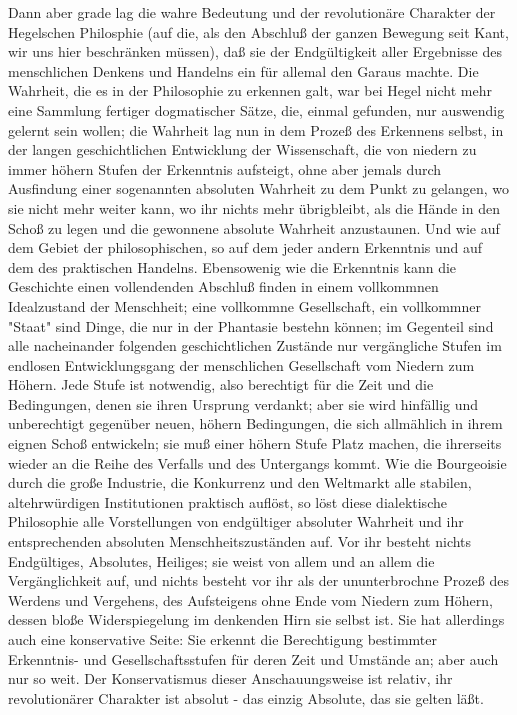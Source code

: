 Dann aber grade lag die wahre Bedeutung und der revolutionäre
Charakter der Hegelschen Philosphie (auf die, als den Abschluß der
ganzen Bewegung seit Kant, wir uns hier beschränken müssen), daß sie der
Endgültigkeit aller Ergebnisse des menschlichen Denkens und Handelns ein
für allemal den Garaus machte. Die Wahrheit, die es in der Philosophie
zu erkennen galt, war bei Hegel nicht mehr eine Sammlung fertiger
dogmatischer Sätze, die, einmal gefunden, nur auswendig gelernt sein
wollen; die Wahrheit lag nun in dem Prozeß des Erkennens selbst, in der
langen geschichtlichen Entwicklung der Wissenschaft, die von niedern zu
immer höhern Stufen der Erkenntnis aufsteigt, ohne aber jemals durch
Ausfindung einer sogenannten absoluten Wahrheit zu dem Punkt zu
gelangen, wo sie nicht mehr weiter kann, wo ihr nichts mehr übrigbleibt,
als die Hände in den Schoß zu legen und die gewonnene absolute Wahrheit
anzustaunen. Und wie auf dem Gebiet der philosophischen, so auf dem
jeder andern Erkenntnis und auf dem des praktischen Handelns.
Ebensowenig wie die Erkenntnis kann die Geschichte einen vollendenden
Abschluß finden in einem vollkommnen Idealzustand der Menschheit; eine
vollkommne Gesellschaft, ein vollkommner "Staat" sind Dinge, die nur in
der Phantasie bestehn können; im Gegenteil sind alle nacheinander
folgenden geschichtlichen Zustände nur vergängliche Stufen im endlosen
Entwicklungsgang der menschlichen Gesellschaft vom Niedern zum Höhern.
Jede Stufe ist notwendig, also berechtigt für die Zeit und die
Bedingungen, denen sie ihren Ursprung verdankt; aber sie wird hinfällig
und unberechtigt gegenüber neuen, höhern Bedingungen, die sich
allmählich in ihrem eignen Schoß entwickeln; sie muß einer höhern Stufe
Platz machen, die ihrerseits wieder an die Reihe des Verfalls und des
Untergangs kommt. Wie die Bourgeoisie durch die große Industrie, die
Konkurrenz und den Weltmarkt alle stabilen, altehrwürdigen Institutionen
praktisch auflöst, so löst diese dialektische Philosophie alle
Vorstellungen von endgültiger absoluter Wahrheit und ihr entsprechenden
absoluten Menschheitszuständen auf. Vor ihr besteht nichts Endgültiges,
Absolutes, Heiliges; sie weist von allem und an allem die
Vergänglichkeit auf, und nichts besteht vor ihr als der ununterbrochne
Prozeß des Werdens und Vergehens, des Aufsteigens ohne Ende vom Niedern
zum Höhern, dessen bloße Widerspiegelung im denkenden Hirn sie selbst
ist. Sie hat allerdings auch eine konservative Seite: Sie erkennt die
Berechtigung bestimmter Erkenntnis- und Gesellschaftsstufen für deren
Zeit und Umstände an; aber auch nur so weit. Der Konservatismus dieser
Anschauungsweise ist relativ, ihr revolutionärer Charakter ist absolut -
das einzig Absolute, das sie gelten läßt.

